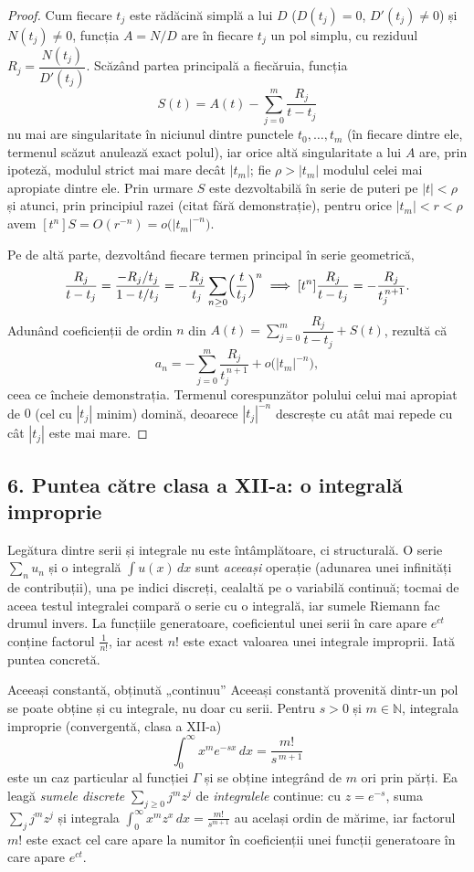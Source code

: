 \begin{proof}
Cum fiecare $t_j$ este rădăcină simplă a lui $D$ ($D(t_j)=0$, $D'(t_j)\neq0$) și $N(t_j)\neq0$, funcția $A=N/D$ are în fiecare $t_j$ un pol simplu, cu reziduul $R_j=\dfrac{N(t_j)}{D'(t_j)}$. Scăzând partea principală a fiecăruia, funcția
\[
S(t)=A(t)-\sum_{j=0}^{m}\frac{R_j}{t-t_j}
\]
nu mai are singularitate în niciunul dintre punctele $t_0,\ldots,t_m$ (în fiecare dintre ele, termenul scăzut anulează exact polul), iar orice altă singularitate a lui $A$ are, prin ipoteză, modulul strict mai mare decât $|t_m|$; fie $\rho>|t_m|$ modulul celei mai apropiate dintre ele. Prin urmare $S$ este dezvoltabilă în serie de puteri pe $|t|<\rho$ și atunci, prin principiul razei (citat fără demonstrație), pentru orice $|t_m|<r<\rho$ avem $[t^n]S=O(r^{-n})=o\bigl(|t_m|^{-n}\bigr)$.

Pe de altă parte, dezvoltând fiecare termen principal în serie geometrică,
\[
\frac{R_j}{t-t_j}=\frac{-R_j/t_j}{1-t/t_j}=-\frac{R_j}{t_j}\sum_{n\ge0}\Bigl(\frac{t}{t_j}\Bigr)^n
\implies [t^n]\frac{R_j}{t-t_j}=-\frac{R_j}{t_j^{\,n+1}}.
\]
Adunând coeficienții de ordin $n$ din $A(t)=\sum_{j=0}^{m}\dfrac{R_j}{t-t_j}+S(t)$, rezultă că
\[
a_n=-\sum_{j=0}^{m}\frac{R_j}{t_j^{\,n+1}}+o\bigl(|t_m|^{-n}\bigr),
\]
ceea ce încheie demonstrația. Termenul corespunzător polului celui mai apropiat de $0$ (cel cu $|t_j|$ minim) domină, deoarece $|t_j|^{-n}$ descrește cu atât mai repede cu cât $|t_j|$ este mai mare.
\end{proof}

\subsection*{6. Puntea către clasa a XII-a: o integrală improprie}

Legătura dintre serii și integrale nu este întâmplătoare, ci structurală. O serie $\sum_n u_n$ și o integrală $\int u(x)\,dx$ sunt \emph{aceeași} operație (adunarea unei infinități de contribuții), una pe indici discreți, cealaltă pe o variabilă continuă; tocmai de aceea testul integralei compară o serie cu o integrală, iar sumele Riemann fac drumul invers. La funcțiile generatoare, coeficientul unei serii în care apare $e^{ct}$ conține factorul $\frac{1}{n!}$, iar acest $n!$ este exact valoarea unei integrale improprii. Iată puntea concretă.

\begin{tehbox}{Aceeași constantă, obținută „continuu''}
Aceeași constantă provenită dintr-un pol se poate obține și cu integrale, nu doar cu serii. Pentru $s>0$ și $m\in\mathbb{N}$, integrala improprie (convergentă, clasa a XII-a)
\[
\int_0^{\infty}x^me^{-sx}\,dx=\frac{m!}{s^{\,m+1}}
\]
este un caz particular al funcției $\Gamma$ și se obține integrând de $m$ ori prin părți. Ea leagă \emph{sumele discrete} $\sum_{j\ge0}j^mz^j$ de \emph{integralele} continue: cu $z=e^{-s}$, suma $\sum_j j^mz^j$ și integrala $\int_0^{\infty}x^mz^x\,dx=\frac{m!}{s^{m+1}}$ au același ordin de mărime, iar factorul $m!$ este exact cel care apare la numitor în coeficienții unei funcții generatoare în care apare $e^{ct}$.
\end{tehbox}

